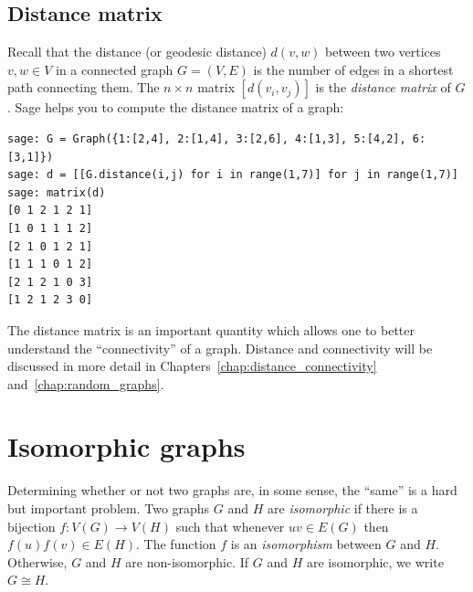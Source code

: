 \subsection{Distance matrix}

Recall that the distance (or geodesic distance) $d(v,w)$ between two
vertices $v,w \in V$ in a connected graph $G = (V,E)$ is the number of
edges in a shortest path connecting them. The $n \times n$ matrix
$[d(v_i, v_j)]$ is the \emph{distance matrix} of $G$. Sage helps you
to compute the distance matrix of a graph:
%
\begin{lstlisting}
sage: G = Graph({1:[2,4], 2:[1,4], 3:[2,6], 4:[1,3], 5:[4,2], 6:[3,1]})
sage: d = [[G.distance(i,j) for i in range(1,7)] for j in range(1,7)]
sage: matrix(d)
[0 1 2 1 2 1]
[1 0 1 1 1 2]
[2 1 0 1 2 1]
[1 1 1 0 1 2]
[2 1 2 1 0 3]
[1 2 1 2 3 0]
\end{lstlisting}

The distance matrix is an important quantity which allows one to
better understand the ``connectivity'' of a graph. Distance and
connectivity will be discussed in more detail in
Chapters~\ref{chap:distance_connectivity}
and~\ref{chap:random_graphs}.



\section{Isomorphic graphs}
\label{chap:introduction:isomorphic_graphs}

Determining whether or not two graphs are, in some sense, the ``same''
is a hard but important problem. Two graphs $G$ and $H$ are
\emph{isomorphic} if there is a bijection
$f: V(G) \longrightarrow V(H)$ such that whenever $uv \in E(G)$ then
$f(u) f(v) \in E(H)$. The function $f$ is an \emph{isomorphism}
between $G$ and $H$. Otherwise, $G$ and $H$ are non-isomorphic. If
$G$ and $H$ are isomorphic, we write $G \cong H$.
\index{$\cong$}

